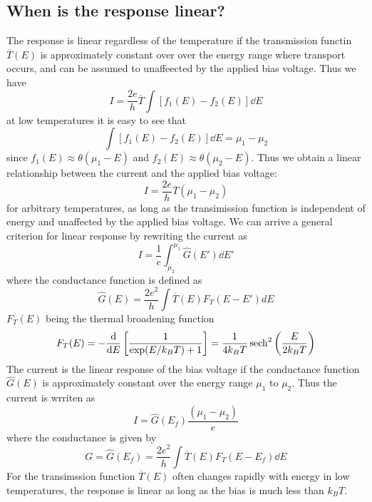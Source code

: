 \documentclass[11pt,a4paper]{book}
\theoremstyle{plain}
\theoremstyle{definition}
\theoremstyle{remark}
\begin{document}
\subsection{When is the response linear?}
The response is linear regardless of the temperature if the transmission functin $\overline{T}(E)$ is approximately constant over over the energy range where transport occurs, and can be assumed to unaffeected by the applied bias voltage. Thus we have
\begin{equation}
    I = \frac{2 e}{h} \overline{T} \int \left[ f_1(E) - f_2(E) \right] \dd E
\end{equation}
at low temperatures it is easy to see that
\begin{equation}
    \int \left[ f_1(E) - f_2(E) \right] \dd E = \mu_1 - \mu_2
\end{equation}
since $f_1(E) \approx \theta(\mu_1 - E)$ and $f_2(E) \approx \theta(\mu_2 - E)$. Thus we obtain a linear relationship between the current and the applied bias voltage:
\begin{equation}
    I = \frac{2 e}{h} \overline{T} (\mu_1 - \mu_2)
\end{equation}
for arbitrary temperatures, as long as the transimission function is independent of energy and unaffected by the applied bias voltage. We can arrive a general criterion for linear response by rewriting the current as 
\begin{equation}
    I = \frac{1}{e} \int^{\mu_1}_{\mu_2} \hat{G}(E') \dd E'
\end{equation}
where the conductance function is defined as
\begin{equation}
    \hat{G}(E) = \frac{2 e^2}{h} \int \overline{T}(E) F_T(E - E')dE 
\end{equation}
$F_T(E)$ being the thermal broadening function
\begin{equation}
    F_T(E) = -\frac{\dd}{\dd E} \left[ \frac{1}{\exp (E/k_B T) + 1} \right] = \frac{1}{4 k_B T} \sech^2 \left(\frac{E}{2 k_B T} \right) 
\end{equation}
The current is the linear response of the bias voltage if the conductance function $\hat{G}(E)$ is approximately constant over the energy range $\mu_1$ to $\mu_2$. Thus the current is wrriten as
\begin{equation}
    I = \hat{G}(E_f) \frac{(\mu_1 - \mu_2)}{e}
\end{equation}
where the conductance is given by
\begin{equation}
    G = \hat{G}(E_f) = \frac{2 e^2}{h} \int \overline{T}(E) F_T(E - E_f) \dd E
\end{equation}
For the transimssion function $\overline{T}(E)$ often changes rapidly with energy in low temperatures, the response is linear as long as the bias is much less than $k_B T$.
\end{document}
